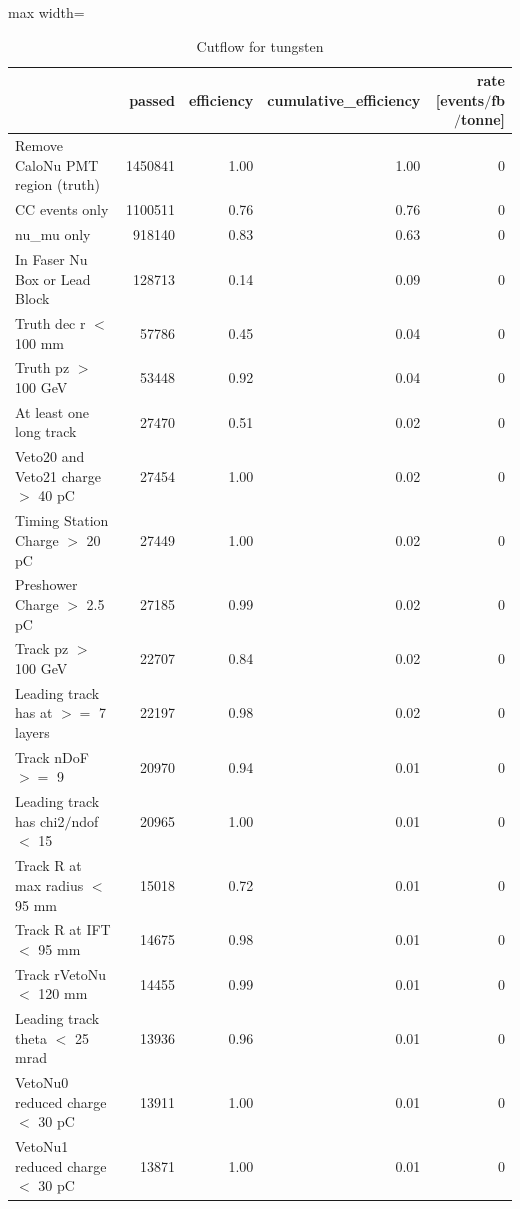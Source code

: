 \documentclass{article}
\begin{document}
\begin{table}
\centering
\caption{Cutflow for tungsten}
\begin{adjustbox}{max width=\textwidth}
\begin{tabular}{lrrrr}
\toprule
 & passed & efficiency & cumulative\_efficiency & rate [events$/$fb$/$tonne] \\
\midrule
Remove CaloNu PMT region (truth) & 1450841 & 1.00 & 1.00 & 0 \\
CC events only & 1100511 & 0.76 & 0.76 & 0 \\
nu\_mu only & 918140 & 0.83 & 0.63 & 0 \\
In Faser Nu Box or Lead Block & 128713 & 0.14 & 0.09 & 0 \\
Truth dec r $<$ 100 mm & 57786 & 0.45 & 0.04 & 0 \\
Truth pz $>$ 100 GeV & 53448 & 0.92 & 0.04 & 0 \\
At least one long track & 27470 & 0.51 & 0.02 & 0 \\
Veto20 and Veto21 charge $>$ 40 pC & 27454 & 1.00 & 0.02 & 0 \\
Timing Station Charge $>$ 20 pC & 27449 & 1.00 & 0.02 & 0 \\
Preshower Charge $>$ 2.5 pC & 27185 & 0.99 & 0.02 & 0 \\
Track pz $>$ 100 GeV & 22707 & 0.84 & 0.02 & 0 \\
Leading track has at $>$$=$ 7 layers & 22197 & 0.98 & 0.02 & 0 \\
Track nDoF $>$$=$ 9 & 20970 & 0.94 & 0.01 & 0 \\
Leading track has chi2$/$ndof $<$ 15 & 20965 & 1.00 & 0.01 & 0 \\
Track R at max radius $<$ 95 mm & 15018 & 0.72 & 0.01 & 0 \\
Track R at IFT $<$ 95 mm & 14675 & 0.98 & 0.01 & 0 \\
Track rVetoNu $<$ 120 mm & 14455 & 0.99 & 0.01 & 0 \\
Leading track theta $<$ 25 mrad & 13936 & 0.96 & 0.01 & 0 \\
VetoNu0 reduced charge $<$ 30 pC & 13911 & 1.00 & 0.01 & 0 \\
VetoNu1 reduced charge $<$ 30 pC & 13871 & 1.00 & 0.01 & 0 \\
\bottomrule
\end{tabular}

\end{adjustbox}
\end{table}
\end{document}
